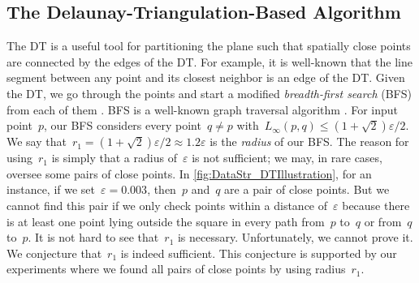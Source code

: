 \subsection{The Delaunay-Triangulation-Based Algorithm}
\label{sec:DataStr_DTAlgorithm} 

The DT is a useful tool for partitioning the plane 
such that spatially close points are connected
by the edges of the DT. 
For example, it is well-known that
the line segment between any point and its closest neighbor
is an edge of the DT.
Given the DT, we go through the points 
and start a modified \emph{breadth-first search} (BFS) 
from each of them
\parencite[e.g.,][]{Maus2010AllCN,Rahmati2013}. 
BFS is a well-known graph traversal algorithm
\parencite[chapter 22]{Cormen2009}. 
For input point~$p$, 
our BFS considers every point~$q\ne p$ 
with~$L_{\infty}(p,q)\le (1+\sqrt{2})\varepsilon /2$. 
We say that~$r_{1}=(1+\sqrt{2})\varepsilon /2\approx 
1.2\varepsilon$ 
is the \emph{radius} of our BFS. 
The reason for using~$r_{1} $ is simply that 
a radius of~$\varepsilon$ is not sufficient; 
we may, in rare cases, oversee some pairs of close points. 
In \fig\ref{fig:DataStr_DTIllustration}, for an instance, 
if we set~$\varepsilon =0.003$, 
then~$p$ and~$q$ are a pair of close points. 
But we cannot find this pair if we only check points 
within a distance of~$\varepsilon$
because there is at least one point lying outside the square 
in every path from~$p$ to~$q$ or from~$q$ to~$p$. 
It is not hard to see that~$r_{1}$ is necessary. Unfortunately, we cannot prove it. 
We conjecture that~$r_{1}$ is indeed sufficient. 
This conjecture is supported by our experiments where 
we found all pairs of close points by using radius~$r_{1}$.



